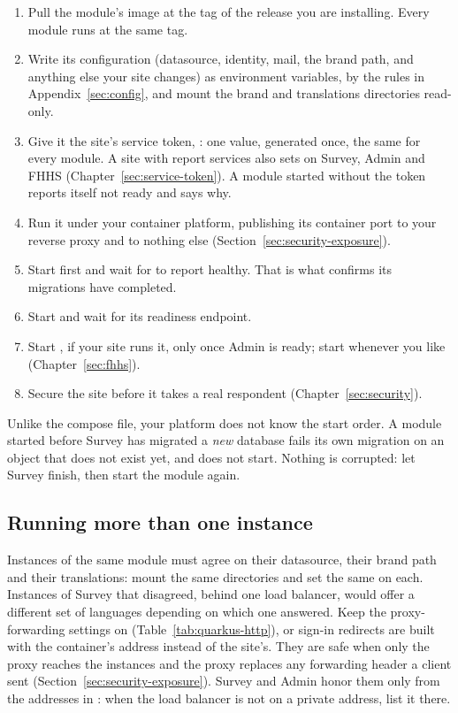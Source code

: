 \documentclass[11pt, a4paper]{article}
\begin{document}
\begin{enumerate}
  \item Pull the module's image at the tag of the release you are installing. Every module
        runs at the same tag.
  \item Write its configuration (datasource, identity, mail, the brand path, and anything else
        your site changes) as environment variables, by the rules in
        Appendix~\ref{sec:config}, and mount the brand and translations directories read-only.
  \item Give it the site's service token, : one value, generated
        once, the same for every module. A site with report services also sets
         on Survey, Admin and FHHS
        (Chapter~\ref{sec:service-token}). A module started without the token reports itself
        not ready and says why.
  \item Run it under your container platform, publishing its container port  to
        your reverse proxy and to nothing else (Section~\ref{sec:security-exposure}).
  \item Start  first and wait for  to report healthy. That is
        what confirms its migrations have completed.
  \item Start  and wait for its readiness endpoint.
  \item Start , if your site runs it, only once Admin is ready; start 
        whenever you like (Chapter~\ref{sec:fhhs}).
  \item Secure the site before it takes a real respondent (Chapter~\ref{sec:security}).
\end{enumerate}

\begin{elicitcaution}
Unlike the compose file, your platform does not know the start order. A module started before
Survey has migrated a \emph{new} database fails its own migration on an object that does not
exist yet, and does not start. Nothing is corrupted: let Survey finish, then start the module
again.
\end{elicitcaution}

\subsection{Running more than one instance}

Instances of the same module must agree on their datasource, their brand path and their
translations: mount the same directories and set the same  on each.
Instances of Survey that disagreed, behind one load balancer, would offer a different set of
languages depending on which one answered. Keep the proxy-forwarding settings on
(Table~\ref{tab:quarkus-http}), or sign-in redirects are built with the container's address
instead of the site's. They are safe when only the proxy reaches the instances and the proxy
replaces any forwarding header a client sent (Section~\ref{sec:security-exposure}). Survey
and Admin honor them only from the addresses in : when the load
balancer is not on a private address, list it there.
\end{document}
